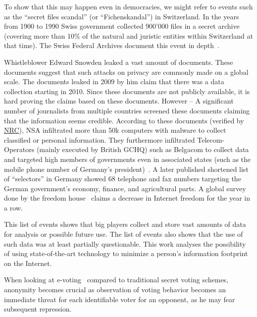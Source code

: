To show that this may happen even in democracies, we might refer to events such as the ``secret files scandal'' (or  ``Fichenskandal'') in Switzerland. In the years from 1900 to 1990 Swiss government collected 900’000 files in a secret archive (covering more than 10\% of the natural and juristic entities within Switzerland at that time). The Swiss Federal Archives document this event in depth~\cite{Leuenberger1989}.

Whistleblower Edward Snowden leaked a vast amount of documents. These documents suggest that such attacks on privacy are commonly made on a global scale. The documents leaked in 2009 by him claim that there was a data collection starting in 2010. Since these documents are not publicly available, it is hard proving the claims based on these documents. However -- A significant number of journalists from multiple countries screened these documents claiming that the information seems credible. According to these documents (verified by \href{http://www.nrc.nl/nieuws/2013/11/23/nederland-sinds-1946-doelwit-van-nsa}{NRC}), NSA infiltrated more than 50k computers with malware to collect classified or personal information. They furthermore infiltrated Telecom-Operators (mainly executed by British GCHQ) such as Belgacom to collect data and targeted high members of governments even in associated states (such as the mobile phone number of Germany's president)~\cite{NCR2013,XKeyscore,Ball2013,Ackerman2013,Greenberg2013}. A later published shortened list of ``selectors'' in Germany showed 68 telephone and fax numbers targeting the German government's economy, finance, and agricultural parts. A global survey done by the freedom house~\cite{FOTN2020} claims a decrease in Internet freedom for the  year in a row. 

This list of events shows that big players collect and store vast amounts of data for analysis or possible future use. The list of events also shows that the use of such data was at least partially questionable. This work analyses the possibility of using state-of-the-art technology to minimize a person's information footprint on the Internet. 

When looking at e-voting~\cite{haenni2008research} compared to traditional secret voting schemes, anonymity becomes crucial as observation of voting behavior becomes an immediate threat for each identifiable voter for an opponent, as he may fear subsequent repression.

